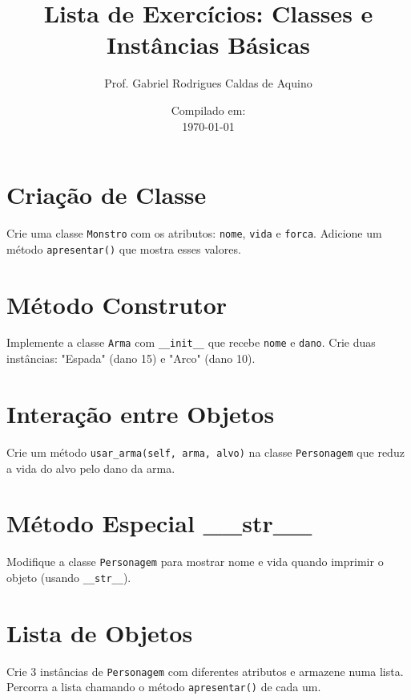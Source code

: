 \title{Lista de Exercícios: Classes e Instâncias Básicas}
\author{Prof. Gabriel Rodrigues Caldas de Aquino}
\date{Compilado em: \\ \today}



\maketitle

\section{Criação de Classe}
Crie uma classe \texttt{Monstro} com os atributos: \texttt{nome}, \texttt{vida} e \texttt{forca}. Adicione um método \texttt{apresentar()} que mostra esses valores.

\section{Método Construtor}
Implemente a classe \texttt{Arma} com \texttt{\_\_init\_\_} que recebe \texttt{nome} e \texttt{dano}. Crie duas instâncias: "Espada" (dano 15) e "Arco" (dano 10).


\section{Interação entre Objetos}
Crie um método \texttt{usar\_arma(self, arma, alvo)} na classe \texttt{Personagem} que reduz a vida do alvo pelo dano da arma.

\section{Método Especial \_\_str\_\_}
Modifique a classe \texttt{Personagem} para mostrar nome e vida quando imprimir o objeto (usando \texttt{\_\_str\_\_}).

\section{Lista de Objetos}
Crie 3 instâncias de \texttt{Personagem} com diferentes atributos e armazene numa lista. Percorra a lista chamando o método \texttt{apresentar()} de cada um.

